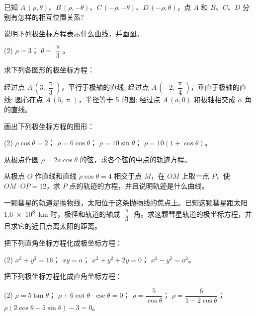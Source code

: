 \begin{Exercise}
  \begin{question}
    \item 已知 $A\,(\rho,\theta)$、$B\,(\rho,-\theta)$、$C\,(-\rho,-\theta)$、$D\,(-\rho,\theta)$，点 $A$ 和 $B$、$C$、$D$ 分别有怎样的相互位置关系?
    \item 说明下列极坐标方程表示什么曲线，并画图。
    \begin{tasks}(2)
      \task $\rho=3$；
      \task $\theta=\dfrac{\uppi}{3}$。
    \end{tasks}
    \item 求下列各图形的极坐标方程：
    \begin{tasks}
      \task 经过点 $A\,(3,\dfrac{\uppi}{3})$，平行于极轴的直线;
      \task 经过点 $A\,(-2,\dfrac{\uppi}{4})$，垂直于极轴的直线;
      \task 圆心在点 $A\,(5,\uppi)$，半径等于 5 的圆;
      \task 经过点 $A\,(a,0)$ 和极轴相交成 $\alpha$ 角的直线。
    \end{tasks}
    \item 画出下列极坐标方程的图形：
    \begin{tasks}(2)
      \task $\rho\cos\theta=2$；
      \task $\rho=6\cos\theta$；
      \task $\rho=10\sin\theta$；
      \task $\rho=10(1+\cos\theta)$。
    \end{tasks}
    \item 从极点作圆 $\rho=2a\cos\theta$ 的弦，求各个弦的中点的轨迹方程。
    \item 从极点 $O$ 作直线和直线 $\rho\cos\theta=4$ 相交于点 $M$，在 $OM$ 上取一点 $P$，使 $OM\cdot OP=12$，求 $P$ 点的轨迹的方程，并且说明轨迹是什么曲线。
    \item 一颗彗星的轨道是抛物线，太阳位于这条抛物线的焦点上。已知这颗彗星距太阳 \qty{1.6e8}{km} 时，极径和轨道的轴成 $\dfrac{\uppi}{3}$ 角。求这颗彗星轨道的极坐标方程，并且求它的近日点离太阳的距离。
    \item 把下列直角坐标方程化成极坐标方程：
    \begin{tasks}(2)
      \task $x^2+y^2=16$；
      \task $xy=a$；
      \task $x^2+y^2+2y=0$；
      \task $x^2-y^2=a^2$。
    \end{tasks}
    \item 把下列极坐标方程化成直角坐标方程：
    \begin{tasks}(2)
      \task $\rho=5\tan\theta$；
      \task $\rho+6\cot\theta\cdot\csc\theta=0$；
      \task $\rho=\dfrac{5}{\cos\theta}$；
      \task $\rho=\dfrac{6}{1-2\cos\theta}$；
      \task $\rho(2\cos\theta-5\sin\theta)-3=0$。
    \end{tasks}

\end{question}
\end{Exercise}

